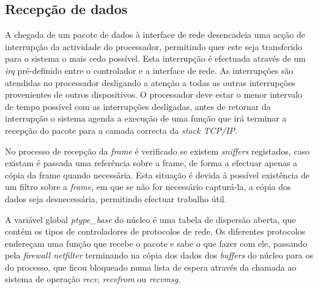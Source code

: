 \subsection{Recepção de dados}

A chegada de um pacote de dados à interface de rede desencadeia uma acção de interrupção da actividade do processador, permitindo quer este seja transferido para o sistema o mais cedo possível. Esta interrupção é efectuada através de um \textit{irq} pré-definido entre o controlador e a interface de rede. As interrupções são atendidas no processador desligando a atenção a todas as outras interrupções provenientes de outros dispositivos. %
O processador deve estar o menor intervalo de tempo possível com as interrupções desligadas, antes de retornar da interrupção o sistema agenda a execução de uma função que irá terminar a recepção do pacote para a camada correcta da \textit{stack TCP/IP}.%

No processo de recepção da \textit{frame} é verificado se existem \textit{sniffers} registados, caso existam é passada uma referência sobre a frame, de forma a efectuar apenas a cópia da frame quando necessária. Esta situação é devida à possível existência de um filtro sobre a \textit{frame}, em que se não for necessário capturá-la, a cópia dos dados seja desnecessária, permitindo efectuar trabalho útil.





A variável global \textit{ptype\_base} do núcleo é uma tabela de dispersão aberta, que contém os tipos de controladores de protocolos de rede. Os diferentes protocolos endereçam uma função que recebe o pacote e sabe o que fazer com ele, passando pela \textit{firewall netfilter} terminando na cópia dos dados dos \textit{buffers} do núcleo para os do processo, que ficou bloqueado numa lista de espera através da chamada ao sistema de operação \textit{recv}, \textit{recvfrom} ou \textit{recvmsg}.

